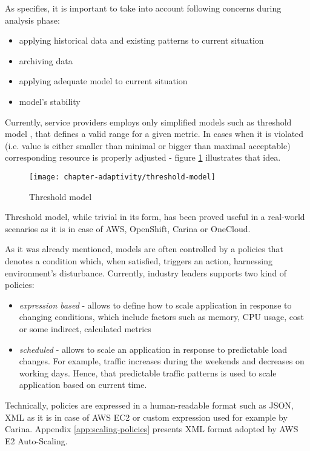 As \cite{brun2009engineering} specifies, it is important to take into account following concerns during analysis phase:
\begin{itemize}
 \item applying historical data and existing patterns to current situation
 \item archiving data
 \item applying adequate model to current situation
 \item model's stability
\end{itemize}

Currently, service providers employs only simplified models such as threshold model \cite{LiWoZh05}, that defines a valid range for a given metric. In cases when it is violated (i.e. value is either smaller than minimal or bigger than maximal acceptable) corresponding resource is properly adjusted - figure \ref{fig:threshold-model} illustrates that idea.

\begin{figure}[!ht]
  \begin{center}
    \texttt{[image: chapter-adaptivity/threshold-model]}
  \end{center}
  \caption{Threshold model}
  \label{fig:threshold-model}
\end{figure}

Threshold model, while trivial in its form, has been proved useful in a real-world scenarios as it is in case of AWS, OpenShift, Carina or OneCloud.

As it was already mentioned, models are often controlled by a policies that denotes a condition which, when satisfied, triggers an action, harnessing environment's disturbance. Currently, industry leaders supports \cite{AmazonAutoScaling} two kind of policies:
\begin{itemize}
 \item \textit{expression based} - allows to define how to scale application in response to changing conditions, which include factors such as memory, CPU usage, cost or some indirect, calculated metrics
 \item \textit{scheduled} - allows to scale an application in response to predictable load changes. For example, traffic increases during the weekends and decreases on working days. Hence, that predictable traffic patterns is used to scale application based on current time.
\end{itemize}

Technically, policies are expressed in a human-readable format such as JSON, XML as it is in case of AWS EC2 or custom expression used for example by Carina. Appendix \ref{app:scaling-policies} presents XML format adopted by AWS E2 Auto-Scaling.

